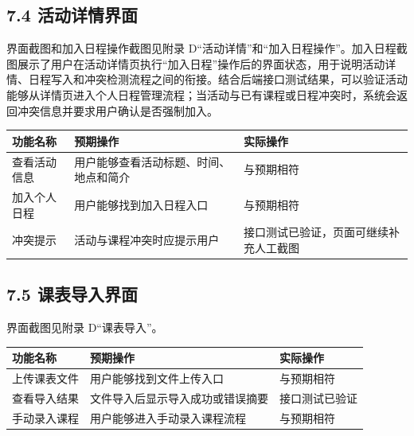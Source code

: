 \subsection{7.4
活动详情界面}\label{ux6d3bux52a8ux8be6ux60c5ux754cux9762}

界面截图和加入日程操作截图见附录
D``活动详情''和``加入日程操作''。加入日程截图展示了用户在活动详情页执行``加入日程''操作后的界面状态，用于说明活动详情、日程写入和冲突检测流程之间的衔接。结合后端接口测试结果，可以验证活动能够从详情页进入个人日程管理流程；当活动与已有课程或日程冲突时，系统会返回冲突信息并要求用户确认是否强制加入。

{\def\LTcaptype{none} %
\begin{longtable}[]{@{}|
  >{\raggedright\arraybackslash}p{}|
  >{\raggedright\arraybackslash}p{}|
  >{\raggedright\arraybackslash}p{}|@{}}
\hline
\rowcolor{gray!12}
\begin{minipage}[b]{\linewidth}\raggedright
\bfseries 功能名称
\end{minipage} & \begin{minipage}[b]{\linewidth}\raggedright
\bfseries 预期操作
\end{minipage} & \begin{minipage}[b]{\linewidth}\raggedright
\bfseries 实际操作
\end{minipage} \\
\hline
\endhead
\hline
\endlastfoot
查看活动信息 & 用户能够查看活动标题、时间、地点和简介 & 与预期相符 \\
\hline
加入个人日程 & 用户能够找到加入日程入口 & 与预期相符 \\
\hline
冲突提示 & 活动与课程冲突时应提示用户 &
接口测试已验证，页面可继续补充人工截图 \\
\hline
\end{longtable}
}

\subsection{7.5
课表导入界面}\label{ux8bfeux8868ux5bfcux5165ux754cux9762}

界面截图见附录 D``课表导入''。

{\def\LTcaptype{none} %
\begin{longtable}[]{@{}|l|l|l|@{}}
\hline
\rowcolor{gray!12}
功能名称 & 预期操作 & 实际操作 \\
\hline
\endhead
\hline
\endlastfoot
上传课表文件 & 用户能够找到文件上传入口 & 与预期相符 \\
\hline
查看导入结果 & 文件导入后显示导入成功或错误摘要 & 接口测试已验证 \\
\hline
手动录入课程 & 用户能够进入手动录入课程流程 & 与预期相符 \\
\hline
\end{longtable}
}

